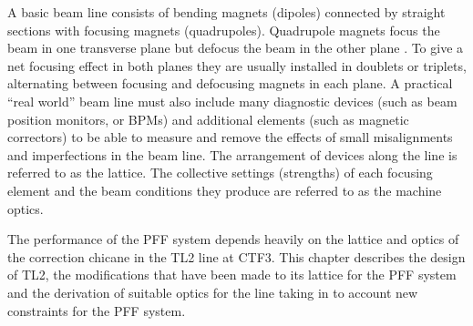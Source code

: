
A basic beam line consists of bending magnets (dipoles) connected by straight sections with focusing magnets (quadrupoles). Quadrupole magnets focus the beam in one transverse plane but defocus the beam in the other plane \cite{wilson}. To give a net focusing effect in both planes they are usually installed in doublets or triplets, alternating between focusing and defocusing magnets in each plane.
A practical ``real world'' beam line must also include many diagnostic devices (such as beam position monitors, or BPMs) and additional elements (such as magnetic correctors) to be able to measure and remove the effects of small misalignments and imperfections in the beam line. The arrangement of devices along the line is referred to as the lattice. The collective settings (strengths) of each focusing element and the beam conditions they produce are referred to as the machine optics. 

The performance of the PFF system depends heavily on the lattice and optics of the correction chicane in the TL2 line at CTF3. This chapter describes the design of TL2, the modifications that have been made to its lattice for the PFF system and the derivation of suitable optics for the line taking in to account new constraints for the PFF system.


